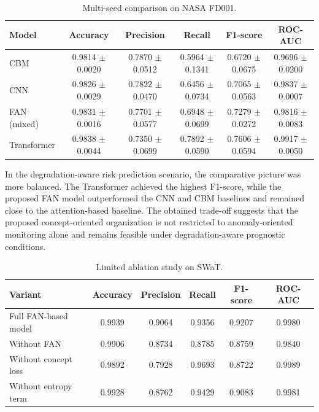 \documentclass[runningheads]{llncs}
\begin{document}
\begin{table}[tbp]
\caption{Multi-seed comparison on NASA FD001.}
\label{tab:fd001_results}
\centering
{\scriptsize\setlength{\tabcolsep}{1.6pt}
\begin{tabular}{lccccc}
\toprule
Model & Accuracy & Precision & Recall & F1-score & ROC-AUC \\
\midrule
CBM & 0.9814 $\pm$ 0.0020 & 0.7870 $\pm$ 0.0512 & 0.5964 $\pm$ 0.1341 & 0.6720 $\pm$ 0.0675 & 0.9696 $\pm$ 0.0200 \\
CNN & 0.9826 $\pm$ 0.0029 & 0.7822 $\pm$ 0.0470 & 0.6456 $\pm$ 0.0734 & 0.7065 $\pm$ 0.0563 & 0.9837 $\pm$ 0.0007 \\
FAN (mixed) & 0.9831 $\pm$ 0.0016 & 0.7701 $\pm$ 0.0577 & 0.6948 $\pm$ 0.0699 & 0.7279 $\pm$ 0.0272 & 0.9816 $\pm$ 0.0083 \\
Transformer & 0.9838 $\pm$ 0.0044 & 0.7350 $\pm$ 0.0699 & 0.7892 $\pm$ 0.0590 & 0.7606 $\pm$ 0.0594 & 0.9917 $\pm$ 0.0050 \\
\bottomrule
\end{tabular}
}
\end{table}

In the degradation-aware risk prediction scenario, the comparative picture was more balanced. The Transformer achieved the highest F1-score, while the proposed FAN model outperformed the CNN and CBM baselines and remained close to the attention-based baseline. The obtained trade-off suggests that the proposed concept-oriented organization is not restricted to anomaly-oriented monitoring alone and remains feasible under degradation-aware prognostic conditions.

\begin{table}[tbp]
\caption{Limited ablation study on SWaT.}
\label{tab:ablation_swat}
\centering
\begin{tabular}{lccccc}
\toprule
Variant & Accuracy & Precision & Recall & F1-score & ROC-AUC \\
\midrule
Full FAN-based model & 0.9939 & 0.9064 & 0.9356 & 0.9207 & 0.9980 \\
Without FAN & 0.9906 & 0.8734 & 0.8785 & 0.8759 & 0.9840 \\
Without concept loss & 0.9892 & 0.7928 & 0.9693 & 0.8722 & 0.9989 \\
Without entropy term & 0.9928 & 0.8762 & 0.9429 & 0.9083 & 0.9981 \\
\bottomrule
\end{tabular}
\end{table}
\end{document}
